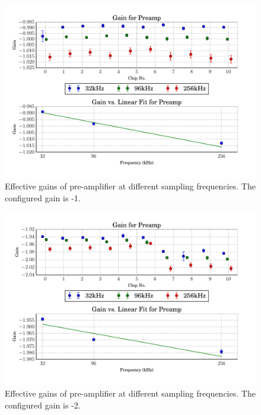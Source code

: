 \begin{figure}
    \centering
    \includegraphics[width=\linewidth]{images/plots/dc_slope_preamp_gain-1.pdf}
    \caption{Effective gains of pre-amplifier at different sampling frequencies. The configured gain is -1.}
    \label{fig:preamp_slope-1}
\end{figure}
\begin{figure}
    \centering
    \includegraphics[width=\linewidth]{images/plots/dc_slope_preamp_gain-2.pdf}
    \caption{Effective gains of pre-amplifier at different sampling frequencies. The configured gain is -2.}
    \label{fig:preamp_slope-2}
\end{figure}

